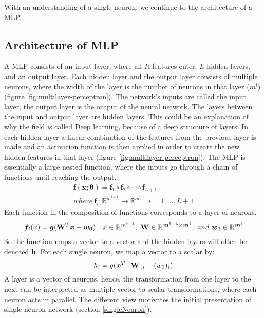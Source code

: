 With an understanding of a single neuron, we continue to the architecture of a MLP.


\subsection{Architecture of MLP}\label{architectureMLP}
A MLP consists of an input layer, where all $R$ features enter, $L$ hidden layers, and an output layer. Each hidden layer and the output layer consists of multiple neurons, where the width of the layer is the number of neurons in that layer ($m^l$) (figure \ref{fig:multilayer-perceptron}). The network's inputs are called the input layer, the output layer is the output of the neural network. The layers between the input and output layer are hidden layers. This could be an explanation of why the field is called Deep learning, because of a deep structure of layers. In each hidden layer a linear combination of the features from the previous layer is made and an activation function is then applied in order to create the new hidden features in that layer (figure \ref{fig:multilayer-perceptron}). The MLP is essentially a large nested function, where the inputs go through a chain of functions until reaching the output.
\begin{align*}
\bm{f}(\bm{x};\bm{\theta})=\bm{f}_1 \circ \bm{f}_2 \circ \cdots \circ \bm{f}_{L+1}\\
where \ \bm{f}_i : \mathbb{R}^{m^{i-1}} \to \mathbb{R}^{m^{i}} \quad i=1,\ldots, L+1
\end{align*}
Each function in the composition of functions corresponds to a layer of neurons.
\begin{align*}
\bm{f}_i(x)=\bm{g}(\mathbf{W}^T \bm{x} + \bm{w_0}) \quad x\in \mathbb{R}^{m^{i-1}}, \ \mathbf{W} \in \mathbb{R}^{\bm{m^{i-1}} \times \bm{m^{i}} }, \ and \ \bm{w}_0 \in \mathbb{R}^{\bm{m}^{i}}
\end{align*}
So the function maps a vector to a vector and the hidden layers will often be denoted $\bm{h}$. For each single neuron, we map a vector to a scalar by:
$$h_i=g(\bm{x}^T \cdot \mathbf{W}_{:,i} + (w_0)_{i})$$
A layer is a vector of neurons, hence, the transformation from one layer to the next can be interpreted as multiple vector to scalar transformations, where each neuron acts in parallel. The different view motivates the initial presentation of single neuron network (section \ref{singleNeuron}).

